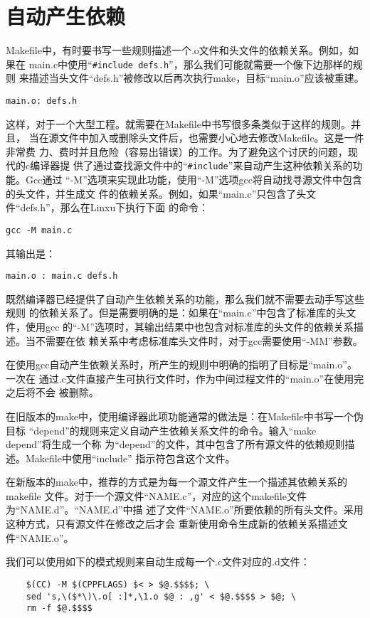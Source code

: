 \section{自动产生依赖}
Makefile中，有时要书写一些规则描述一个.o文件和头文件的依赖关系。例如，如果在
main.c中使用“\verb"#include defs.h"”，那么我们可能就需要一个像下边那样的规则
来描述当头文件“defs.h”被修改以后再次执行make，目标“main.o”应该被重建。
\begin{Verbatim}[]
main.o: defs.h
\end{Verbatim}
这样，对于一个大型工程。就需要在Makefile中书写很多条类似于这样的规则。并且，
当在源文件中加入或删除头文件后，也需要小心地去修改Makefile。这是一件非常费
力、费时并且危险（容易出错误）的工作。为了避免这个讨厌的问题，现代的c编译器提
供了通过查找源文件中的“\verb"#include"”来自动产生这种依赖关系的功能。Gcc通过
“-M”选项来实现此功能，使用“-M”选项gcc将自动找寻源文件中包含的头文件，并生成文
件的依赖关系。例如，如果“main.c”只包含了头文件“defs.h”，那么在Linxu下执行下面
的命令：
\begin{Verbatim}[]
gcc -M main.c
\end{Verbatim}
其输出是：
\begin{Verbatim}[]
main.o : main.c defs.h
\end{Verbatim}
既然编译器已经提供了自动产生依赖关系的功能，那么我们就不需要去动手写这些规则
的依赖关系了。但是需要明确的是：如果在“main.c”中包含了标准库的头文件，使用gcc
的“-M”选项时，其输出结果中也包含对标准库的头文件的依赖关系描述。当不需要在依
赖关系中考虑标准库头文件时，对于gcc需要使用“-MM”参数。

在使用gcc自动产生依赖关系时，所产生的规则中明确的指明了目标是“main.o”。一次在
通过.c文件直接产生可执行文件时，作为中间过程文件的“main.o”在使用完之后将不会
被删除。

在旧版本的make中，使用编译器此项功能通常的做法是：在Makefile中书写一个伪目标
“depend”的规则来定义自动产生依赖关系文件的命令。输入“make depend”将生成一个称
为“depend”的文件，其中包含了所有源文件的依赖规则描述。Makefile中使用“include”
指示符包含这个文件。

在新版本的make中，推荐的方式是为每一个源文件产生一个描述其依赖关系的makefile
文件。对于一个源文件“NAME.c”，对应的这个makefile文件为“NAME.d”。“NAME.d”中描
述了文件“NAME.o”所要依赖的所有头文件。采用这种方式，只有源文件在修改之后才会
重新使用命令生成新的依赖关系描述文件“NAME.o”。

我们可以使用如下的模式规则来自动生成每一个.c文件对应的.d文件：
\begin{Verbatim}[]
%.d: %.c
    $(CC) -M $(CPPFLAGS) $< > $@.$$$$; \
    sed 's,\($*\)\.o[ :]*,\1.o $@ : ,g' < $@.$$$$ > $@; \
    rm -f $@.$$$$
\end{Verbatim}


